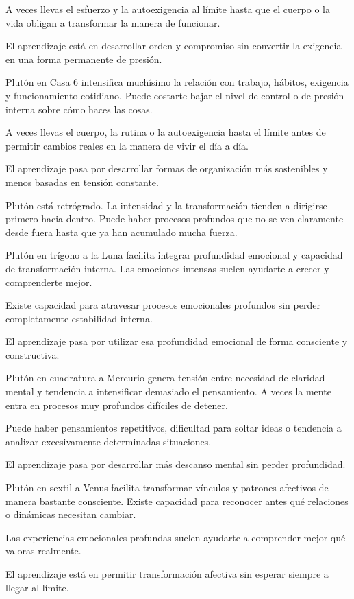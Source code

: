 \documentclass[11pt,a4paper]{article}
\begin{document}
A veces llevas el esfuerzo y la autoexigencia al límite hasta que el cuerpo o la vida obligan a transformar la manera de funcionar.

El aprendizaje está en desarrollar orden y compromiso sin convertir la exigencia en una forma permanente de presión.

Plutón en Casa 6 intensifica muchísimo la relación con trabajo, hábitos, exigencia y funcionamiento cotidiano. Puede costarte bajar el nivel de control o de presión interna sobre cómo haces las cosas.

A veces llevas el cuerpo, la rutina o la autoexigencia hasta el límite antes de permitir cambios reales en la manera de vivir el día a día.

El aprendizaje pasa por desarrollar formas de organización más sostenibles y menos basadas en tensión constante.

Plutón está retrógrado. La intensidad y la transformación tienden a dirigirse primero hacia dentro. Puede haber procesos profundos que no se ven claramente desde fuera hasta que ya han acumulado mucha fuerza.

Plutón en trígono a la Luna facilita integrar profundidad emocional y capacidad de transformación interna. Las emociones intensas suelen ayudarte a crecer y comprenderte mejor.

Existe capacidad para atravesar procesos emocionales profundos sin perder completamente estabilidad interna.

El aprendizaje pasa por utilizar esa profundidad emocional de forma consciente y constructiva.

Plutón en cuadratura a Mercurio genera tensión entre necesidad de claridad mental y tendencia a intensificar demasiado el pensamiento. A veces la mente entra en procesos muy profundos difíciles de detener.

Puede haber pensamientos repetitivos, dificultad para soltar ideas o tendencia a analizar excesivamente determinadas situaciones.

El aprendizaje pasa por desarrollar más descanso mental sin perder profundidad.

Plutón en sextil a Venus facilita transformar vínculos y patrones afectivos de manera bastante consciente. Existe capacidad para reconocer antes qué relaciones o dinámicas necesitan cambiar.

Las experiencias emocionales profundas suelen ayudarte a comprender mejor qué valoras realmente.

El aprendizaje está en permitir transformación afectiva sin esperar siempre a llegar al límite.
\end{document}
